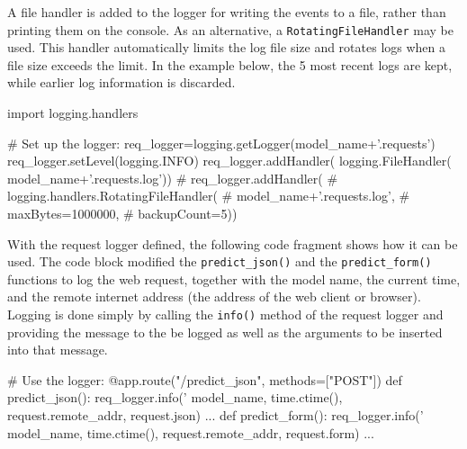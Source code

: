 A file handler is added to the logger for writing the events to a file, rather than printing them on the console. As an alternative, a \texttt{RotatingFileHandler} may be used. This handler automatically limits the log file size and rotates logs when a file size exceeds the limit. In the example below, the 5 most recent logs are kept, while earlier log information is discarded. 

\begin{pythoncode}
import logging.handlers

# Set up the logger:
req_logger=logging.getLogger(model_name+'.requests')
req_logger.setLevel(logging.INFO)
req_logger.addHandler(
    logging.FileHandler(
        model_name+'.requests.log'))
# req_logger.addHandler(
#     logging.handlers.RotatingFileHandler(
#         model_name+'.requests.log',
#         maxBytes=1000000,
#         backupCount=5))
\end{pythoncode}

With the request logger defined, the following code fragment shows how it can be used. The code block modified the \texttt{predict\_json()} and the \texttt{predict\_form()} functions to log the web request, together with the model name, the current time, and the remote internet address (the address of the web client or browser). Logging is done simply by calling the \texttt{info()} method of the request logger and providing the message to the be logged as well as the arguments to be inserted into that message. 

\begin{pythoncode}
# Use the logger:
@app.route("/predict_json", methods=["POST"])
def predict_json():
    req_logger.info('%
                    model_name, 
                    time.ctime(), 
                    request.remote_addr, 
                    request.json)
...
def predict_form():
    req_logger.info('%
                    model_name,
                    time.ctime(),
                    request.remote_addr,
                    request.form)
...
\end{pythoncode}

